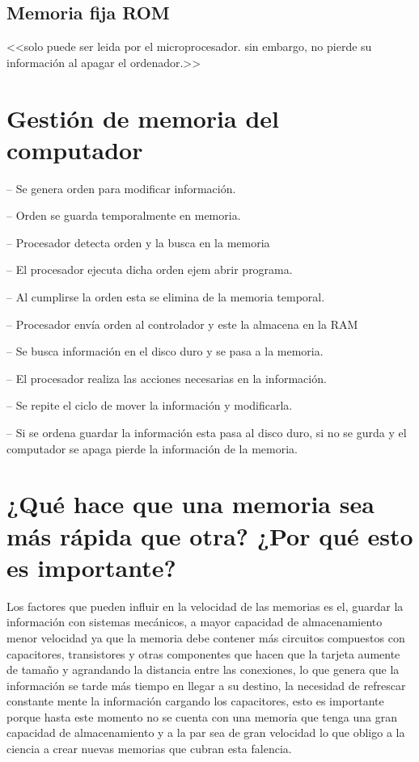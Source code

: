 \documentclass{article}
\begin{document}
\subsection{Memoria fija ROM  }
<<solo puede ser leida por el microprocesador. sin embargo, no pierde su información al apagar el ordenador.>> \cite{transisores}


\section{Gestión de memoria del computador}


-- Se genera orden para modificar información.

-- Orden se guarda temporalmente en memoria.

-- Procesador detecta orden y la busca en la memoria 

-- El procesador ejecuta dicha orden ejem abrir programa. 

-- Al cumplirse la orden esta se elimina de la memoria temporal.

-- Procesador envía orden al controlador y este la almacena en la RAM

-- Se busca información en el disco duro y se pasa a la memoria.

-- El procesador realiza las acciones necesarias en la información. 

-- Se repite el ciclo de mover la información y modificarla. 

-- Si se ordena guardar la información esta pasa al disco duro, si no se gurda y el computador se apaga pierde la información de la memoria.\cite{computadores}


\section{¿Qué hace que una memoria sea más rápida que otra? ¿Por qué esto es importante?}

Los factores que pueden influir en la velocidad de las memorias es el, guardar la información con sistemas mecánicos, a mayor capacidad de almacenamiento menor velocidad ya que la memoria debe contener más circuitos compuestos con capacitores, transistores y otras componentes que hacen que la tarjeta aumente de tamaño y agrandando   la distancia entre las conexiones, lo que genera que la información se tarde más tiempo en llegar a su destino, la necesidad de refrescar constante mente la información cargando los capacitores, esto es importante porque hasta este momento no se cuenta con una memoria que tenga una gran capacidad de almacenamiento y a la par sea de gran velocidad lo que obligo a la ciencia a crear nuevas memorias que cubran esta falencia. 
\end{document}
